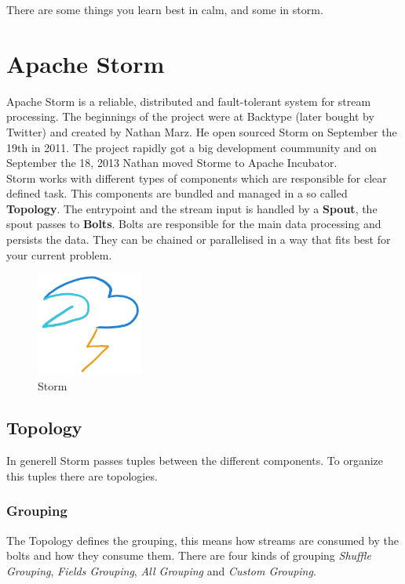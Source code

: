 \begin{savequote}[75mm]
There are some things you learn best in calm, and some in storm.
\end{savequote}

\chapter{Apache Storm}

Apache Storm is a reliable, distributed and fault-tolerant system for stream processing.
The beginnings of the project were at Backtype (later bought by Twitter) and created by Nathan Marz.
He open sourced Storm on September the 19th in 2011. The project rapidly got a big development coummunity and
on September the 18, 2013 Nathan moved Storme to Apache Incubator.\\

Storm works with different types of components which are responsible for clear defined task.
This components are bundled and managed in a so called \textbf{Topology}.
The entrypoint and the stream input is handled by a \textbf{Spout}, the spout passes to \textbf{Bolts}.
Bolts are responsible for the main data processing and persists the data.
They can be chained or parallelised in a way that fits best for your current problem.

\begin{figure}[hp]
\centering
\captionsetup{justification=centering}
\includegraphics[width=100pt]{images/storm.png}
\caption[Storm]{Storm}
\end{figure}

\newpage

\section{Topology}
In generell Storm passes tuples between the different components.
To organize this tuples there are topologies.

\subsection{Grouping}
The Topology defines the grouping, this means how streams are consumed by the bolts and how they consume them.
There are four kinds of grouping \textit{Shuffle Grouping}, \textit{Fields Grouping},
\textit{All Grouping} and \textit{Custom Grouping}.

